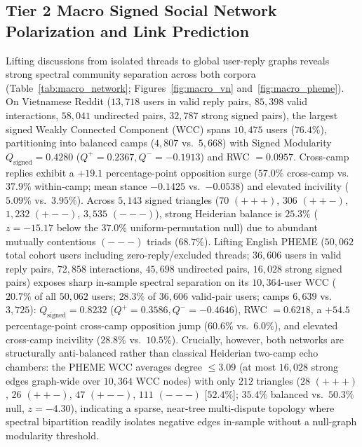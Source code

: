 \documentclass[conference]{IEEEtran}
\begin{document}
\subsection{Tier 2 Macro Signed Social Network Polarization and Link Prediction}
Lifting discussions from isolated threads to global user-reply graphs reveals strong spectral community separation across both corpora (Table~\ref{tab:macro_network}; Figures~\ref{fig:macro_vn} and~\ref{fig:macro_pheme}). On Vietnamese Reddit ($13{,}718$ users in valid reply pairs, $85{,}398$ valid interactions, $58{,}041$ undirected pairs, $32{,}787$ strong signed pairs), the largest signed Weakly Connected Component (WCC) spans $10{,}475$ users ($76.4\%$), partitioning into balanced camps ($4{,}807$ vs.\ $5{,}668$) with Signed Modularity $Q_{\text{signed}} = 0.4280$ ($Q^+ = 0.2367, Q^- = -0.1913$) and RWC $= 0.0957$. Cross-camp replies exhibit a $+19.1$ percentage-point opposition surge ($57.0\%$ cross-camp vs.\ $37.9\%$ within-camp; mean stance $-0.1425$ vs.\ $-0.0538$) and elevated incivility ($5.09\%$ vs.\ $3.95\%$). Across $5{,}143$ signed triangles ($70$ $(+++)$, $306$ $(++-)$, $1{,}232$ $(+--)$, $3{,}535$ $(---)$), strong Heiderian balance is $25.3\%$ ($z = -15.17$ below the $37.0\%$ uniform-permutation null) due to abundant mutually contentious $(---)$ triads ($68.7\%$). Lifting English PHEME ($50{,}062$ total cohort users including zero-reply/excluded threads; $36{,}606$ users in valid reply pairs, $72{,}858$ interactions, $45{,}698$ undirected pairs, $16{,}028$ strong signed pairs) exposes sharp in-sample spectral separation on its $10{,}364$-user WCC ($20.7\%$ of all $50{,}062$ users; $28.3\%$ of $36{,}606$ valid-pair users; camps $6{,}639$ vs.\ $3{,}725$): $Q_{\text{signed}} = 0.8232$ ($Q^+ = 0.3586, Q^- = -0.4646$), RWC $= 0.6218$, a $+54.5$ percentage-point cross-camp opposition jump ($60.6\%$ vs.\ $6.0\%$), and elevated cross-camp incivility ($28.8\%$ vs.\ $10.5\%$). Crucially, however, both networks are structurally anti-balanced rather than classical Heiderian two-camp echo chambers: the PHEME WCC averages degree $\le 3.09$ (at most $16{,}028$ strong edges graph-wide over $10{,}364$ WCC nodes) with only $212$ triangles ($28$ $(+++)$, $26$ $(++-)$, $47$ $(+--)$, $111$ $(---)$ [$52.4\%$]; $35.4\%$ balanced vs.\ $50.3\%$ null, $z = -4.30$), indicating a sparse, near-tree multi-dispute topology where spectral bipartition readily isolates negative edges in-sample without a null-graph modularity threshold.
\end{document}
